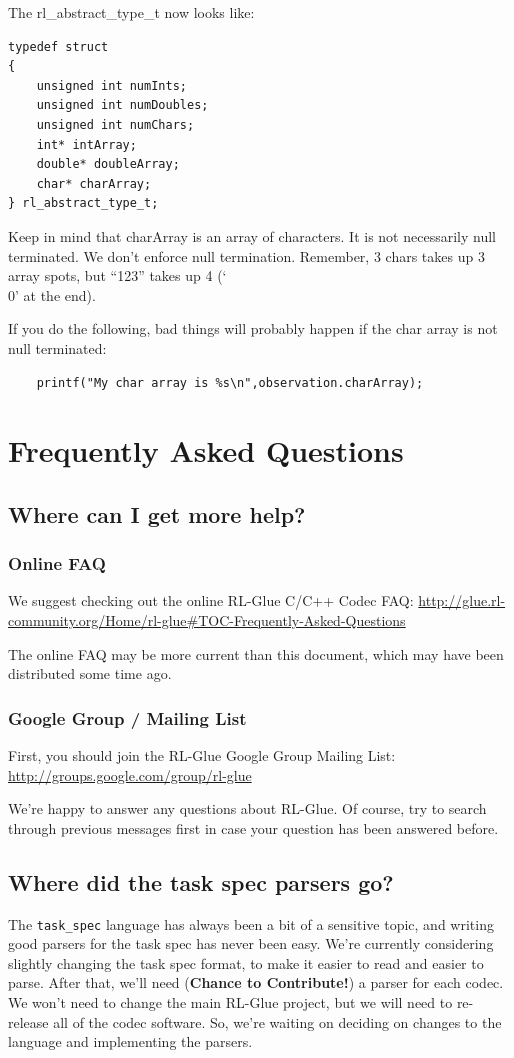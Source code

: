 \documentclass[11pt]{article}
\begin{document}
The rl\_abstract\_type\_t now looks like:
\begin{verbatim}
typedef struct
{
    unsigned int numInts;
    unsigned int numDoubles;
    unsigned int numChars;
    int* intArray;
    double* doubleArray;
    char* charArray;
} rl_abstract_type_t;
\end{verbatim}

Keep in mind that charArray is an array of characters.  It is not necessarily null terminated.  We don't enforce null termination. Remember, 3 chars takes up 3 array spots, but ``123'' takes up 4 (`\\0' at the end).

If you do the following, bad things will probably happen if the char array is not null terminated:
\begin{verbatim}
	printf("My char array is %s\n",observation.charArray);
\end{verbatim}

\section{Frequently Asked Questions}
\label{faq}
\subsection{Where can I get more help?}
\subsubsection{Online FAQ}
We suggest checking out the online RL-Glue C/C++ Codec FAQ:\newline
\url{http://glue.rl-community.org/Home/rl-glue#TOC-Frequently-Asked-Questions}

The online FAQ may be more current than this document, which may have been distributed some time ago.

\subsubsection{Google Group / Mailing List}
First, you should join the RL-Glue Google Group Mailing List:\newline
\url{http://groups.google.com/group/rl-glue}

We're happy to answer any questions about RL-Glue.  Of course, try to search through previous messages first in case your question has been answered before.

\subsection{Where did the task spec parsers go?}
The \texttt{task\_spec} language has always been a bit of a sensitive topic, and writing good parsers for the task spec has never been easy. We're currently considering slightly changing the task spec format, to make
it easier to read and easier to parse.  After that, we'll need (\textbf{Chance to Contribute!}) a parser for each codec.  We won't need to change the main RL-Glue project, but we will need to re-release all of the 
codec software.  So, we're waiting on deciding on changes to the language and implementing the parsers.
\end{document}
